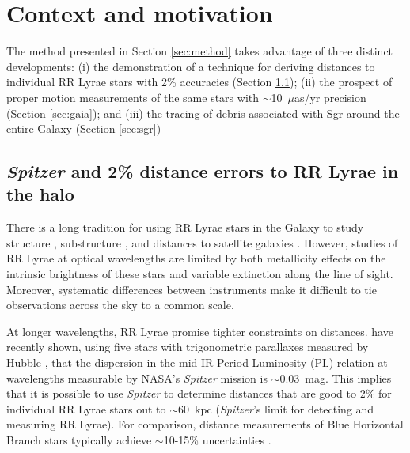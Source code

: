 \documentclass{emulateapj}
\begin{document}
\section{Context and motivation} \label{sec:context}
The method presented in Section \ref{sec:method} takes advantage of
three distinct developments: (i)
the demonstration of a technique for deriving distances to individual
RR Lyrae stars with 2\% accuracies (Section \ref{sec:spitzer}); (ii)
the prospect of proper motion measurements of the same stars with
$\sim$10~$\mu$as/yr precision (Section \ref{sec:gaia}); and (iii) the
tracing of debris associated with Sgr around the entire Galaxy
(Section \ref{sec:sgr})

\subsection{{\it Spitzer} and 2\% distance errors to RR Lyrae in the halo}
\label{sec:spitzer}

There is a long tradition for using RR Lyrae stars in the Galaxy to
study structure 
\citep[e.g.][]{shapley18}, substructure
\citep[e.g.][]{sesar10}, and distances to satellite galaxies
\citep[e.g.][]{clementini03}.  However, studies of RR Lyrae at optical
wavelengths are limited by both metallicity effects on the intrinsic
brightness of these stars and variable extinction along the line of
sight.  Moreover, systematic differences between instruments make it
difficult to tie observations across the sky to a common scale. 

At longer wavelengths, RR Lyrae promise tighter constraints on
distances.  
\citet{madore12} have recently shown, 
using five stars with
trigonometric parallaxes measured by Hubble \citep{benedict11},
that the dispersion in the mid-IR Period-Luminosity (PL) relation 
\citep[first mapped by][]{longmore86}
at
wavelengths measurable by NASA's {\it Spitzer} mission is $\sim$0.03~mag.
This implies that it is
possible to use {\it Spitzer} to determine distances that are good to $2\%$ for 
individual RR Lyrae stars out to $\sim$60~kpc ({\it Spitzer}'s limit for detecting and measuring RR Lyrae).
For comparison, distance measurements of Blue Horizontal Branch
stars typically
achieve $\sim$10-15\% uncertainties  \citep[if appropriate color measurements are available, e.g.,][]{deason12b}.
\end{document}

